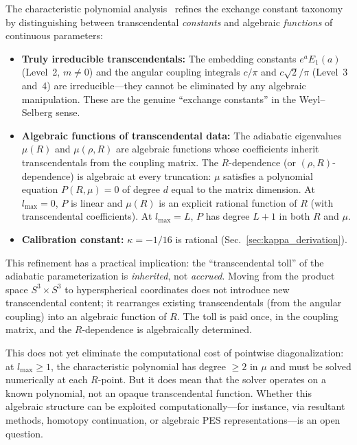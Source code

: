\documentclass[aps,pra,twocolumn,superscriptaddress,longbibliography]{revtex4-2}
\begin{document}
The characteristic polynomial analysis~\cite{loutey_track_p1}
refines the exchange constant taxonomy by distinguishing between
transcendental \emph{constants} and algebraic \emph{functions} of
continuous parameters:
\begin{itemize}
  \item \textbf{Truly irreducible transcendentals:}
    The embedding constants $e^a E_1(a)$ (Level~2, $m \neq 0$) and the
    angular coupling integrals $c/\pi$ and $c\sqrt{2}/\pi$
    (Level~3 and~4) are irreducible---they cannot be eliminated by
    any algebraic manipulation.  These are the genuine ``exchange
    constants'' in the Weyl--Selberg sense.
  \item \textbf{Algebraic functions of transcendental data:}
    The adiabatic eigenvalues $\mu(R)$ and $\mu(\rho,R)$ are
    algebraic functions whose coefficients inherit transcendentals
    from the coupling matrix.  The $R$-dependence (or $(\rho,R)$-dependence)
    is algebraic at every truncation: $\mu$ satisfies a polynomial
    equation $P(R,\mu) = 0$ of degree $d$ equal to the matrix dimension.
    At $l_{\max} = 0$, $P$ is linear and $\mu(R)$ is an explicit
    rational function of $R$ (with transcendental coefficients).
    At $l_{\max} = L$, $P$ has degree $L+1$ in both $R$ and $\mu$.
  \item \textbf{Calibration constant:} $\kappa = -1/16$ is rational
    (Sec.~\ref{sec:kappa_derivation}).
\end{itemize}

This refinement has a practical implication: the ``transcendental toll''
of the adiabatic parameterization is \emph{inherited}, not \emph{accrued}.
Moving from the product space $S^3 \times S^3$ to hyperspherical
coordinates does not introduce new transcendental content; it
rearranges existing transcendentals (from the angular coupling)
into an algebraic function of $R$.  The toll is paid once, in the
coupling matrix, and the $R$-dependence is algebraically determined.

This does not yet eliminate the computational cost of pointwise
diagonalization: at $l_{\max} \geq 1$, the characteristic polynomial
has degree $\geq 2$ in $\mu$ and must be solved numerically at each
$R$-point.  But it does mean that the solver operates on a known
polynomial, not an opaque transcendental function.  Whether this
algebraic structure can be exploited computationally---for instance,
via resultant methods, homotopy continuation, or algebraic
PES representations---is an open question.
\end{document}
